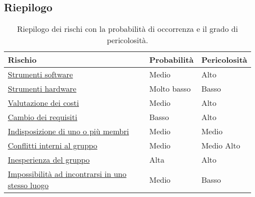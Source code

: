 \subsection{Riepilogo}
{\renewcommand\arraystretch{1.2} 
\begin{table}[h]
\begin{tabular}{|l|l|l|}
\hline
\textbf{Rischio} & \textbf{Probabilità} & \textbf{Pericolosità} \\
\hline
 \hyperlink{subsubsect:software}{Strumenti software} & Medio & Alto \\
\hline
\hyperlink{subsubsect:hardware}{Strumenti hardware} & Molto basso & Basso\\
\hline
\hyperlink{subsubsect:costi}{Valutazione dei costi} & Medio & Alto \\
\hline
\hyperlink{subsubsect:requisiti}{Cambio dei requisiti} & Basso & Alto \\
\hline
\hyperlink{subsubsect:indisposizione}{Indisposizione di uno o più membri} & Medio & Medio \\
\hline
\hyperlink{subsubsect:conflitti}{Conflitti interni al gruppo} & Medio & Medio Alto \\
\hline
\hyperlink{subsubsect:inesperienza}{Inesperienza del gruppo} & Alta & Alto \\
\hline
\hyperlink{subsubsect:incontri}{Impossibilità ad incontrarsi in uno stesso luogo} & Medio & Basso \\
\hline
\end{tabular}
\caption{Riepilogo dei rischi con la probabilità di occorrenza e il grado di pericolosità.}
\end{table}}


\newpage